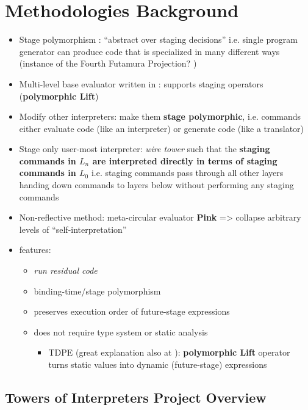 \documentclass{article}
\begin{document}
\section{Methodologies Background}
\begin{itemize}
	\item Stage polymorphism \cite{ofenbeck2017staging}: ``abstract over staging decisions'' i.e. single program generator can produce code that is specialized in many different ways (instance of the Fourth Futamura Projection? \cite{gluck2009there}) 
	\item Multi-level base evaluator written in \mslang: supports staging operators (\textbf{polymorphic Lift})
	\item Modify other interpreters: make them \textbf{stage polymorphic}, i.e. commands either evaluate code (like an interpreter) or generate code (like a translator)
	\item Stage only user-most interpreter: \textit{wire tower} such that the \textbf{staging commands in $L_{n}$ are interpreted directly in terms of staging commands in $L_{0}$} i.e. staging commands pass through all other layers handing down commands to layers below without performing any staging commands
	\item Non-reflective method: meta-circular evaluator \textbf{Pink} => collapse arbitrary levels of ``self-interpretation''
	\item \mslang features:
	\begin{itemize}
		\item \textit{run residual code}
		\item binding-time/stage polymorphism \cite{henglein1994polymorphic}
		\item preserves execution order of future-stage expressions
		\item does not require type system or static analysis
		\begin{itemize}
			\item TDPE \cite{danvy1999type} (great explanation also at \cite{grobauer2001second}): \textbf{polymorphic Lift} operator turns static values into dynamic (future-stage) expressions
		\end{itemize}
	\end{itemize}
\end{itemize}

\subsection{Towers of Interpreters Project Overview}
\end{document}
